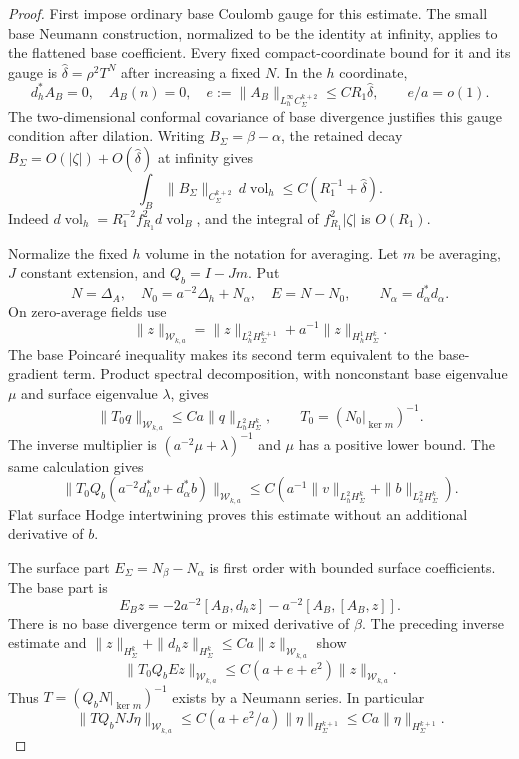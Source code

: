 \documentclass[11pt]{amsart}
\theoremstyle{definition}
\theoremstyle{remark}
\theoremstyle{plain}
\begin{document}
\begin{proof}
First impose ordinary base Coulomb gauge for this estimate.
The small base Neumann construction, normalized to be the identity
at infinity, applies to the flattened base coefficient.
Every fixed compact-coordinate bound for it and its gauge
is $\widehat\delta=\rho^2T^N$ after increasing a fixed $N$.
In the $h$ coordinate,
\[
 d_h^*A_B=0,\quad A_B(n)=0,\quad
 e:=\|A_B\|_{L^\infty_hC^{k+2}_\Sigma}\leq CR_1\widehat\delta,
 \qquad e/a=o(1).
\]
The two-dimensional conformal covariance of base divergence
justifies this gauge condition after dilation.
Writing $B_\Sigma=\beta-\alpha$, the retained decay
$B_\Sigma=O(|\zeta|)+O(\widehat\delta)$ at infinity gives
\begin{equation}\label{eq:excision-compact-average-coefficient}
 \int_B\|B_\Sigma\|_{C^{k+2}_\Sigma}\,d\operatorname{vol}_h
                           \leq C(R_1^{-1}+\widehat\delta).
\end{equation}
Indeed $d\operatorname{vol}_h=R_1^{-2}f_{R_1}^2d\operatorname{vol}_B$,
and the integral of $f_{R_1}^2|\zeta|$ is $O(R_1)$.

Normalize the fixed $h$ volume in the notation for averaging.
Let $m$ be averaging, $J$ constant extension, and $Q_b=I-Jm$.
Put
\[
 N=\Delta_A,\quad N_0=a^{-2}\Delta_h+N_\alpha,\quad
 E=N-N_0,\qquad N_\alpha=d_\alpha^*d_\alpha.
\]
On zero-average fields use
\[
 \|z\|_{\mathcal W_{k,a}}
   =\|z\|_{L^2_hH^{k+1}_\Sigma}
                         +a^{-1}\|z\|_{H^1_hH^k_\Sigma}.
\]
The base Poincar\'e inequality makes its second term equivalent
to the base-gradient term. Product spectral decomposition,
with nonconstant base eigenvalue $\mu$ and surface eigenvalue
$\lambda$, gives
\begin{equation}\label{eq:excision-compact-mean-zero-inverse}
 \|T_0q\|_{\mathcal W_{k,a}}\leq Ca\|q\|_{L^2_hH^k_\Sigma},
 \qquad T_0=(N_0|_{\ker m})^{-1}.
\end{equation}
The inverse multiplier is $(a^{-2}\mu+\lambda)^{-1}$ and
$\mu$ has a positive lower bound. The same calculation gives
\[
 \|T_0Q_b(a^{-2}d_h^*v+d_\alpha^*b)\|_{\mathcal W_{k,a}}
                  \leq C(a^{-1}\|v\|_{L^2_hH^k_\Sigma}
                                      +\|b\|_{L^2_hH^k_\Sigma}).
\]
Flat surface Hodge intertwining proves this estimate without
an additional derivative of $b$.

The surface part $E_\Sigma=N_\beta-N_\alpha$ is first order
with bounded surface coefficients. The base part is
\[
 E_Bz=-2a^{-2}[A_B,d_hz]-a^{-2}[A_B,[A_B,z]].
\]
There is no base divergence term or mixed derivative of $\beta$.
The preceding inverse estimate and
$\|z\|_{H^k_\Sigma}+\|d_hz\|_{H^k_\Sigma}\leq Ca\|z\|_{\mathcal W_{k,a}}$
show
\[
 \|T_0Q_bEz\|_{\mathcal W_{k,a}}
                         \leq C(a+e+e^2)\|z\|_{\mathcal W_{k,a}}.
\]
Thus $T=(Q_bN|_{\ker m})^{-1}$ exists by a Neumann series.
In particular
\[
 \|TQ_bNJ\eta\|_{\mathcal W_{k,a}}
          \leq C(a+e^2/a)\|\eta\|_{H^{k+1}_\Sigma}
          \leq Ca\|\eta\|_{H^{k+1}_\Sigma}.
\]


\end{proof}
\end{document}

